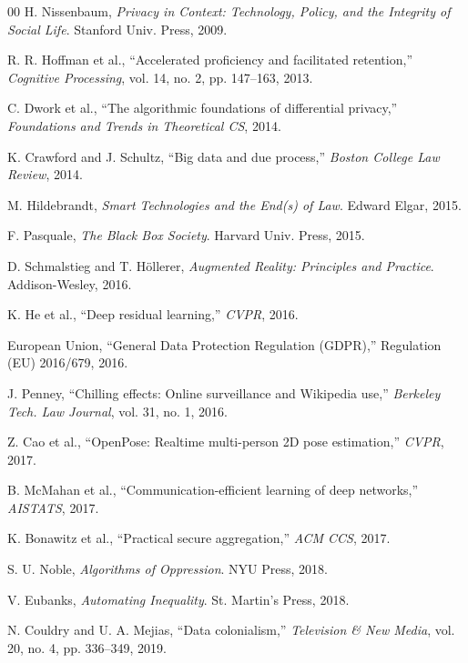 \documentclass[conference]{IEEEtran}
\begin{document}
\begin{thebibliography}{00}
 H. Nissenbaum, \textit{Privacy in Context: Technology, Policy, and the Integrity of Social Life}. Stanford Univ. Press, 2009.

 R. R. Hoffman et al., ``Accelerated proficiency and facilitated retention,'' \textit{Cognitive Processing}, vol. 14, no. 2, pp. 147--163, 2013.


 C. Dwork et al., ``The algorithmic foundations of differential privacy,'' \textit{Foundations and Trends in Theoretical CS}, 2014.

 K. Crawford and J. Schultz, ``Big data and due process,'' \textit{Boston College Law Review}, 2014.

 M. Hildebrandt, \textit{Smart Technologies and the End(s) of Law}. Edward Elgar, 2015.

 F. Pasquale, \textit{The Black Box Society}. Harvard Univ. Press, 2015.

 D. Schmalstieg and T. H\"ollerer, \textit{Augmented Reality: Principles and Practice}. Addison-Wesley, 2016.

 K. He et al., ``Deep residual learning,'' \textit{CVPR}, 2016.

 European Union, ``General Data Protection Regulation (GDPR),'' Regulation (EU) 2016/679, 2016.

 J. Penney, ``Chilling effects: Online surveillance and Wikipedia use,'' \textit{Berkeley Tech. Law Journal}, vol. 31, no. 1, 2016.

 Z. Cao et al., ``OpenPose: Realtime multi-person 2D pose estimation,'' \textit{CVPR}, 2017.


 B. McMahan et al., ``Communication-efficient learning of deep networks,'' \textit{AISTATS}, 2017.

 K. Bonawitz et al., ``Practical secure aggregation,'' \textit{ACM CCS}, 2017.

 S. U. Noble, \textit{Algorithms of Oppression}. NYU Press, 2018.

 V. Eubanks, \textit{Automating Inequality}. St. Martin's Press, 2018.

 N. Couldry and U. A. Mejias, ``Data colonialism,'' \textit{Television \& New Media}, vol. 20, no. 4, pp. 336--349, 2019.


\end{thebibliography}
\end{document}
